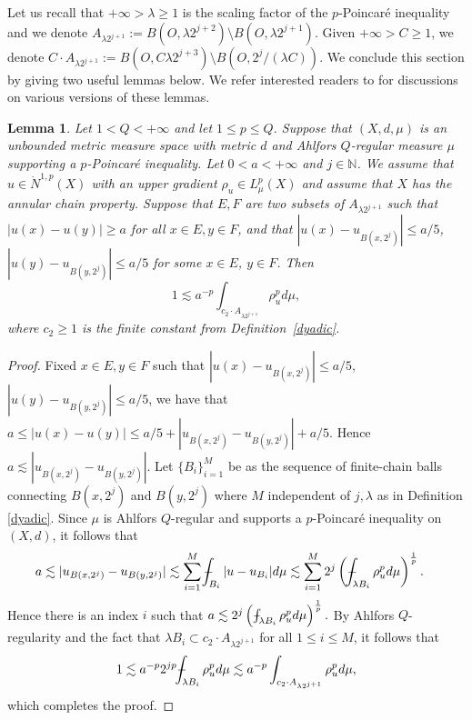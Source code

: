 \documentclass[10pt]{amsart}
\def\Xint#1{\mathchoice
	{\XXint\displaystyle\textstyle{#1}}
	{\XXint\textstyle\scriptstyle{#1}}
	{\XXint\scriptstyle\scriptscriptstyle{#1}}
	{\XXint\scriptscriptstyle\scriptscriptstyle{#1}}
	\!\int}
\def\XXint#1#2#3{{\setbox0=\hbox{$#1{#2#3}{\int}$ }
		\vcenter{\hbox{$#2#3$ }}\kern-.6\wd0}}
\def\dashint{\Xint-}
\newtheorem{lemma}[theorem]{Lemma}
\numberwithin{equation}{section}
\begin{document}
Let us recall that  $+\infty>\lambda\geq 1$ is the scaling factor of the $p$-Poincar\'e inequality and we denote  $A_{\lambda 2^{j+1}}:= B(O,\lambda 2^{j+2})\setminus B(O,\lambda 2^{j+1})$.  Given $+\infty>C\ge 1$, we denote $C\cdot A_{\lambda 2^{j+1}}:=B(O, C\lambda 2^{j+3})\setminus B(O, 2^{j}/(\lambda C))$.  We conclude this section by giving two useful lemmas  below. We refer interested readers to \cite{HK98,KN22} for discussions on various versions of these lemmas.

\begin{lemma}\label{lem3.1}
Let  $1<Q<+\infty$ and let $1\le p\le Q$. 
Suppose that $(X,d,\mu)$ is an unbounded metric measure space with metric $d$ and Ahlfors $Q$-regular measure $\mu$ supporting a $p$-Poincar\'e inequality.
	Let  $0<a<+\infty$ and $j\in\mathbb N$. We assume  that $u\in  \dot N^{1,p}(X)$ with an upper gradient $\rho_u\in L^p_\mu(X)$ and assume that $X$ has the annular chain property. Suppose that
	 $E,F$ are two subsets of $A_{\lambda 2^{j+1}}$ such that $|u(x)-u(y)|\geq a$ for all $x\in E, y\in F$, and that
		$|u(x)-u_{B(x,2^j)}|\leq {a}/{5}$, $|u(y)-u_{B(y,2^{j})}|\leq {a}/{5}$ for some $x\in E$, $y\in F$.
		Then 
			\begin{equation}
			\label{eq3.3-1907} 
			1 \lesssim  a^{-p}\int_{c_2\cdot A_{\lambda 2^{j+1}}}\rho_u^pd\mu,
			\end{equation}
   where $c_2\ge 1$ is the finite constant from Definition~\ref{dyadic}.
\end{lemma}
\begin{proof}Fixed $x\in E,y\in F$ such that $|u(x)-u_{B(x,2^j)}|\leq {a}/{5}$, $|u(y)-u_{B(y,2^{j})}|\leq {a}/{5}$, 
we have that
	$
		a\leq |u(x)-u(y)|\leq {a}/{5} + |u_{B(x,2^j)}-u_{B(y,2^j)}|+{a}/{5}.
		$
	Hence
		$
		a\lesssim |u_{B(x,2^j)}-u_{B(y,2^j)}|.
		$
	Let $\{B_i\}_{i=1}^M$  be as the sequence of  finite-chain balls connecting $B(x,2^j)$ and $B(y,2^j)$  where $M$ independent of $j,\lambda$ as in Definition \ref{dyadic}.
	Since $\mu$ is Ahlfors $Q$-regular and supports a $p$-Poincar\'e inequality on $(X,d)$, it follows that 
		\begin{align*}
		a&\lesssim |u_{B(x,2^j)}- u_{B(y,2^j)}|
		\lesssim \sum_{i=1}^M \dashint_{B_i}|u-u_{B_i}|d\mu \lesssim \sum_{i=1}^M 2^j \left (\dashint_{\lambda B_i}\rho_u^pd\mu\right )^{\frac{1}{p}}.
		\end{align*}
	Hence there is an index $i$  such that 
		$a\lesssim 2^j \left (\dashint_{\lambda B_i}\rho_u^pd\mu\right )^{\frac{1}{p}}.
		$
		 By Ahlfors $Q$-regularity and the fact that  $\lambda B_i\subset c_2\cdot A_{\lambda 2^{j+1}}$ for all $1\le i\le M$, it follows that 
   \[
   1\lesssim a^{-p}2^{jp}\dashint_{\lambda B_i}\rho_u^pd\mu\lesssim a^{-p}\int_{c_2\cdot A_{\lambda 2^{j+1}}}\rho_u^pd\mu,
   \]
   which completes the proof.
\end{proof}
\end{document}
